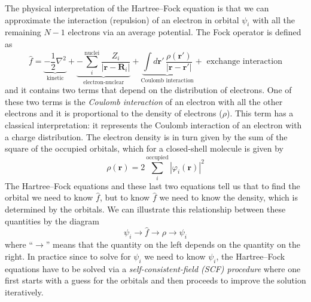 \documentclass[../Main/chem371-notes.tex]{subfiles}
\begin{document}
The physical interpretation of the Hartree--Fock equation is that we can approximate the interaction (repulsion) of an electron in orbital $\psi_i$ with all the remaining $N-1$ electrons via an average potential. 
The Fock operator is defined as
\begin{equation}
\hat{f} = \underbrace{-\frac{1}{2}\nabla^2}_{\text{kinetic}}
+\underbrace{
- \sum_i^{\mathrm{nuclei}} \frac{Z_i}{|\mathbf{r} - \mathbf{R}_i|}
}_{\text{electron-nuclear}}
+
\underbrace{
\int d\mathbf{r}' \, \frac{\rho(\mathbf{r}')}{|\mathbf{r} -\mathbf{r}'|}
}_{\text{Coulomb interaction}} + \text{ exchange interaction}
\end{equation}
and it contains two terms that depend on the distribution of electrons.
One of these two terms is the \emph{Coulomb interaction} of an electron with all the other electrons and it is proportional to the density of electrons ($\rho$). This term has a classical interpretation: it represents the Coulomb interaction of an electron with a charge distribution.
The electron density is in turn given by the sum of the square of the occupied orbitals, which for a closed-shell molecule is given by
\begin{equation}
\rho(\mathbf{r}) = 2 \sum_{i}^\mathrm{occupied} |\varphi_i(\mathbf{r})|^2
\end{equation}
The Hartree--Fock equations and these last two equations tell us that to find the orbital we need to know $\hat{f}$, but to know $\hat{f}$ we need to know the density, which is determined by the orbitals.
We can illustrate this relationship between these quantities by the diagram
\begin{equation}
\psi_i \rightarrow \hat{f} \rightarrow \rho \rightarrow \psi_i
\end{equation}
where ``$\rightarrow$'' means that the quantity on the left depends on the quantity on the right.
In practice since to solve for $\psi_i$ we need to know $\psi_i$, the Hartree--Fock equations have to be solved via a \emph{self-consistent-field (SCF) procedure} where one first starts with a guess for the orbitals and then proceeds to improve the solution iteratively.
\end{document}
